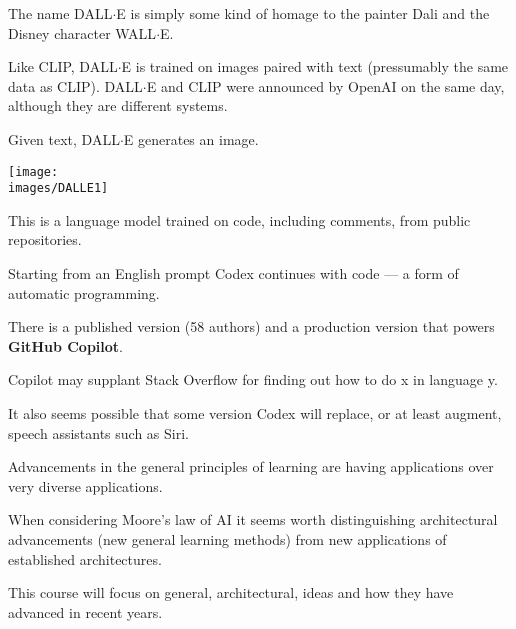 {

The name DALL$\cdot$E is simply some kind of homage to the painter Dali and the Disney character WALL$\cdot$E.

\vfill
Like CLIP, DALL$\cdot$E is trained on images paired with text (pressumably the same data as CLIP).  DALL$\cdot$E and CLIP were announced by OpenAI on the same day, although they are different systems.

\vfill
Given text, DALL$\cdot$E generates an image.



\centerline{\texttt{[image: \\images/DALLE1]}}


This is a language model trained on code, including comments, from public repositories.

\vfill
Starting from an English prompt Codex continues with code --- a form of automatic programming.

\vfill
There is a published version (58 authors) and a production version that powers {\bf GitHub Copilot}.

\vfill
Copilot may supplant Stack Overflow for finding out how to do x in language y.

\vfill
It also seems possible that some version Codex will replace, or at least augment, speech assistants such as Siri.


Advancements in the general principles of learning are having applications over very diverse applications.

\vfill
When considering Moore's law of AI it seems worth distinguishing architectural advancements (new general learning methods)
from new applications of established architectures.

\vfill
This course will focus on general, architectural, ideas and how they have advanced in recent years.


}

